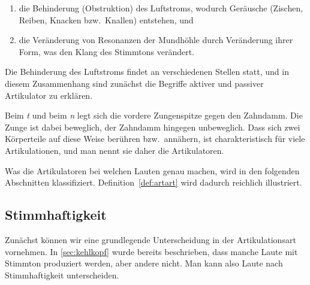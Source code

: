 \begin{enumerate}\Lf
  \item die Behinderung (Obstruktion) des Luftstroms, wodurch Geräusche (Zischen, Reiben, Knacken bzw.\ Knallen) entstehen, und
  \item die Veränderung von Resonanzen der Mundhöhle durch Veränderung ihrer Form, was den Klang des Stimmtons verändert.
\end{enumerate}

Die Behinderung des Luftstroms findet an verschiedenen Stellen statt, und in diesem Zusammenhang sind zunächst die Begriffe aktiver und passiver Artikulator zu erklären.


Beim \textit{t} und beim \textit{n} legt sich die vordere Zungenspitze gegen den Zahndamm.
Die Zunge ist dabei beweglich, der Zahndamm hingegen unbeweglich.
Dass sich zwei Körperteile auf diese Weise berühren bzw.\ annähern, ist charakteristisch für viele Artikulationen, und man nennt sie daher die Artikulatoren.


Was die Artikulatoren bei welchen Lauten genau machen, wird in den folgenden Abschnitten klassifiziert.
Definition~\ref{def:artart} wird dadurch reichlich illustriert.


\subsection{Stimmhaftigkeit}

\label{sec:stimmhaftigkeit}

Zunächst können wir eine grundlegende Unterscheidung in der Artikulationsart vornehmen.
In \ref{sec:kehlkopf} wurde bereits beschrieben, dass manche Laute mit Stimmton produziert werden, aber andere nicht.
Man kann also Laute nach Stimmhaftigkeit unterscheiden.


